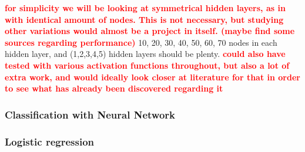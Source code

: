\documentclass[a4paper]{article}
\newcommand\red[1]{\textcolor{red}{\textbf{#1}}}
\begin{document}
\red{for simplicity we will be looking at symmetrical hidden layers, as in with identical amount of nodes. This is not necessary, but studying other variations would almost be a project in itself. (maybe find some sources regarding performance)}
10, 20, 30, 40, 50, 60, 70 nodes in each hidden layer, and (1,2,3,4,5) hidden layers should be plenty. \red{could also have tested with various activation functions throughout, but also a lot of extra work, and would ideally look closer at literature for that in order to see what has already been discovered regarding it}
\subsubsection{Classification with Neural Network}

\subsubsection{Logistic regression}

\end{document}

